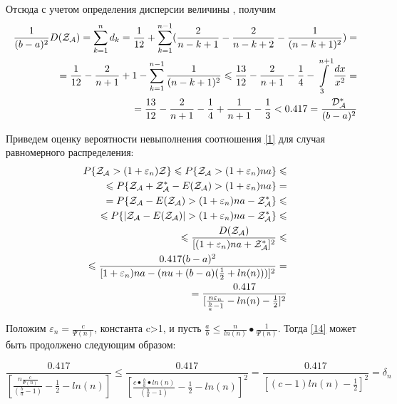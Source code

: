 \documentclass[a4paper, 14pt]{extarticle}
\numberwithin{equation}{section}
\begin{document}
Отсюда с учетом определения дисперсии величины \randomvalue{} , получим
\begin{equation}
\begin{aligned}
\frac{1}{(b-a)^2} \text{$D(\text{$\mathcal{Z_{A}}$})$} = \sum_{k=1}^n d_k = \frac{1}{12} + \sum_{k=1}^{n-1} (\frac{2}{n-k+1} - \frac{2}{n-k+2} - \frac{1}{(n-k+1)^2}) = \\
= \frac{1}{12} - \frac{2}{n+1} +1 - \sum_{k=1}^{n-1} \frac{1}{(n-k+1)^2} \leqslant \frac{13}{12} - \frac{2}{n+1} - \frac{1}{4} - \int\limits_3^{n+1} \frac{dx}{x^2} = \\
= \frac{13}{12} - \frac{2}{n+1} - \frac{1}{4} + \frac{1}{n+1} - \frac{1}{3} < 0.417 = \frac{\text{$\mathcal{D^*_{A}}$}}{(b-a)^2} 
\end{aligned}
\end{equation}

Приведем оценку вероятности невыполнения соотношения \eqref{1} для случая равномерного распределения:
\begin{equation}\label{14}
\begin{aligned}
P\{ \text{$\mathcal{Z_{A}}$} > (1+\varepsilon_n) \mathcal{Z} \} \leqslant P\{ \text{$\mathcal{Z_{A}}$} > (1+\varepsilon_n)na \} \leqslant \\
\leqslant P\{ \text{$\mathcal{Z_{A}}$} + \text{$\mathcal{Z^*_{A}}$} - \text{$E(\text{$\mathcal{Z_{A}}$})$} > (1+\varepsilon_n)na \} = \\
= P \{ \text{$\mathcal{Z_{A}}$} - \text{$E(\text{$\mathcal{Z_{A}}$})$} > (1+\varepsilon_n)na - \text{$\mathcal{Z^*_{A}}$} \} \leqslant \\
\leqslant P \{ |\text{$\mathcal{Z_{A}}$} - \text{$E(\text{$\mathcal{Z_{A}}$})$}| > (1+\varepsilon_n)na - \text{$\mathcal{Z^*_{A}}$} \} \leqslant \\
\leqslant \frac{\text{$D(\text{$\mathcal{Z_{A}}$})$}}{[(1+\varepsilon_n)na + \text{$\mathcal{Z^*_{A}}$}]^2} \leqslant \\
\leqslant \frac{0.417(b-a)^2}{[1+\varepsilon_n)na-(nu+(b-a)(\frac{1}{2}+ln(n)))]^2} = \\
= \frac{0.417}{[\frac{n\varepsilon_n}{\frac{b}{a}-1}-ln(n) -\frac{1}{2}]^2}
\end{aligned}
\end{equation}

Положим $\varepsilon_n = \frac{c}{\Psi(n)}$, константа c>1, и пусть $\frac{a}{b} \leqslant \frac{n}{ln(n)} • \frac{1}{\Psi(n)}$. Тогда \eqref{14} может быть продолжено следующим образом:

\begin{equation}
\frac{0.417}{[\frac{n\frac{c}{\Psi(n)}}{(\frac{b}{a}-1)}-\frac{1}{2}-ln(n)]} \leqslant \frac{0.417}{[\frac{c•\frac{b}{a}•ln(n)}{(\frac{b}{a}-1)}-\frac{1}{2}-ln(n)]^2} = \frac{0.417}{[(c-1)ln(n)-\frac{1}{2}]^2} = \delta_n
\end{equation}
\end{document}
